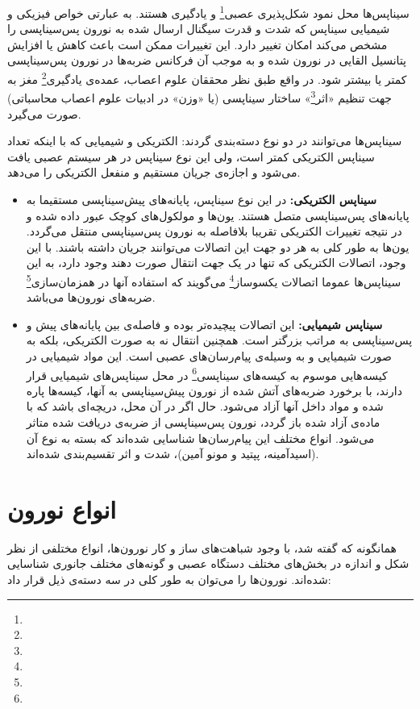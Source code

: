 سیناپس‌ها محل نمود شکل‌پذیری عصبی\footnote{} و یادگیری هستند. به عبارتی خواص فیزیکی و شیمیایی سیناپس که شدت و قدرت سیگنال ارسال شده به نورون پس‌سیناپسی را مشخص می‌کند امکان تغییر دارد. این تغییرات ممکن است باعث کاهش یا افزایش پتانسیل القایی در نورون شده و به موجب آن فرکانس ضربه‌ها در نورون پس‌سیناپسی کمتر یا بیشتر شود. در واقع طبق نظر محققان علوم اعصاب، عمده‌ی یادگیری\footnote{} مغز به جهت تنظیم «اثر\footnote{}» ساختار سیناپسی (یا «وزن» در ادبیات علوم اعصاب محاسباتی) صورت می‌گیرد. 

سیناپس‌ها می‌توانند در دو نوع دسته‌بندی گردند: الکتریکی و شیمیایی که با اینکه تعداد سیناپس الکتریکی کمتر است، ولی این نوع سیناپس در هر سیستم عصبی یافت می‌شود و اجازه‌ی جریان مستقیم و منفعل الکتریکی را می‌دهد.

\begin{itemize}
\item
\textbf{سیناپس الکتریکی:} در این نوع سیناپس، پایانه‌های پیش‌سیناپسی مستقیما به پایانه‌های پس‌سیناپسی متصل هستند. یون‌ها و مولکول‌های کوچک عبور داده شده و در نتیجه تغییرات الکتریکی تقریبا بلافاصله به نورون پس‌سیناپسی منتقل می‌گردد. یون‌ها به طور کلی به هر دو جهت این اتصالات می‌توانند جریان داشته باشند. با این وجود، اتصالات الکتریکی که تنها در یک جهت انتقال صورت دهند وجود دارد، به این سیناپس‌ها عموما اتصالات یکسوساز\footnote{} می‌گویند که استفاده آنها در همزمان‌سازی\footnote{} ضربه‌های نورون‌ها می‌باشد. 
\item
\textbf{سیناپس شیمیایی:}
این اتصالات پیچیده‌تر بوده و فاصله‌ی بین پایانه‌های پیش و پس‌سیناپسی به مراتب بزرگتر است. همچنین انتقال نه به صورت الکتریکی، بلکه به صورت شیمیایی و به وسیله‌ی پیام‌رسان‌های عصبی است. این مواد شیمیایی در کیسه‌هایی موسوم به کیسه‌های سیناپسی\footnote{} در محل سیناپس‌های شیمیایی قرار دارند، با برخورد ضربه‌های آتش شده از نورون پیش‌سیناپسی به آنها، کیسه‌ها پاره شده و مواد داخل آنها آزاد می‌شود. حال اگر در آن محل، دریچه‌ای باشد که با ماده‌ی آزاد شده باز گردد، نورون پس‌سیناپسی از ضربه‌ی دریافت شده متاثر می‌شود. انواع مختلف این پیام‌رسان‌ها شناسایی شده‌اند که بسته به نوع آن (اسید‌آمینه، پپتید و مونو آمین)، شدت و اثر تقسیم‌بندی شده‌اند.
\end{itemize}

\section{انواع نورون}
همانگونه که گفته شد، با وجود شباهت‌های ساز و کار نورون‌ها، انواع مختلفی از نظر شکل و اندازه در بخش‌های مختلف دستگاه عصبی و گونه‌های مختلف جانوری شناسایی شده‌اند. نورون‌ها را می‌توان به طور کلی در سه دسته‌ی ذیل قرار داد:

